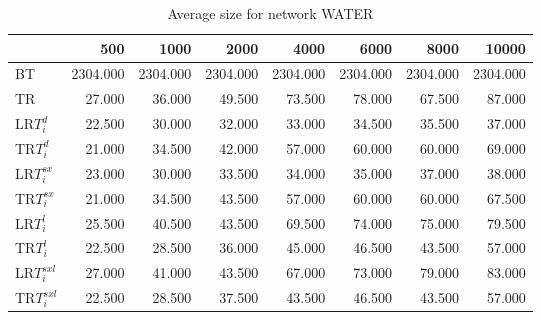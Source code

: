\begin{table}
\begin{center}
\begin{tabular}{lrrrrrrr}
 & 500 & 1000 & 2000 & 4000 & 6000 & 8000 & 10000\\\hline
BT & 2304.000 & 2304.000 & 2304.000 & 2304.000 & 2304.000 & 2304.000 & 2304.000\\\hline
TR & 27.000 & 36.000 & 49.500 & 73.500 & 78.000 & 67.500 & 87.000\\\hline
LR$T_i^d$ & 22.500 & 30.000 & 32.000 & 33.000 & 34.500 & 35.500 & 37.000\\\hline
TR$T_i^d$ & 21.000 & 34.500 & 42.000 & 57.000 & 60.000 & 60.000 & 69.000\\\hline
LR$T_i^{sx}$ & 23.000 & 30.000 & 33.500 & 34.000 & 35.000 & 37.000 & 38.000\\\hline
TR$T_i^{sx}$ & 21.000 & 34.500 & 43.500 & 57.000 & 60.000 & 60.000 & 67.500\\\hline
LR$T_i^l$ & 25.500 & 40.500 & 43.500 & 69.500 & 74.000 & 75.000 & 79.500\\\hline
TR$T_i^l$ & 22.500 & 28.500 & 36.000 & 45.000 & 46.500 & 43.500 & 57.000\\\hline
LR$T_i^{sxl}$ & 27.000 & 41.000 & 43.500 & 67.000 & 73.000 & 79.000 & 83.000\\\hline
TR$T_i^{sxl}$ & 22.500 & 28.500 & 37.500 & 43.500 & 46.500 & 43.500 & 57.000\\\hline
\end{tabular}
\end{center}
\caption{Average size for network WATER }
\label{Watersi}
\end{table}

